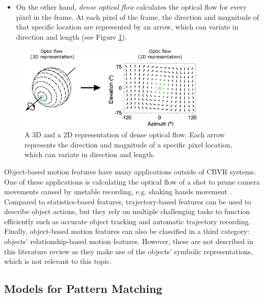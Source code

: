 \begin{itemize}
\begin{itemize}
        \item On the other hand, \textit{dense optical flow} calculates the optical flow for every pixel in the frame. At each pixel of the frame, the direction and magnitude of that specific location are represented by an arrow, which can variate in direction and length (see Figure \ref{fig:dense_optical_flow_representation}).
        
    \end{itemize}

\end{itemize}

\begin{figure}[h] 
\centerline{\includegraphics[width=0.80\textwidth]{figures/litsurvey/dense_optical_flow_representation.png}}
\caption{\label{fig:dense_optical_flow_representation}A 3D and a 2D representation of dense optical flow. Each arrow represents the direction and magnitude of a specific pixel location, which can variate in direction and length.}
\end{figure}

Object-based motion features have many applications outside of CBVR systems. One of these applications is calculating the optical flow of a shot to prune camera movements caused by unstable recording, e.g. shaking hands movement \cite{wang2016actionregonition}. Compared to statistics-based features, trajectory-based features can be used to describe object actions, but they rely on multiple challenging tasks to function efficiently such as accurate object tracking and automatic trajectory recording. Finally, object-based motion features can also be classified in a third category: objects' relationship-based motion features. However, these are not described in this literature review as they make use of the objects' symbolic representations, which is not relevant to this topic.


\subsection{Models for Pattern Matching}
\label{sec:litsurvey-models-pattern-matching}


